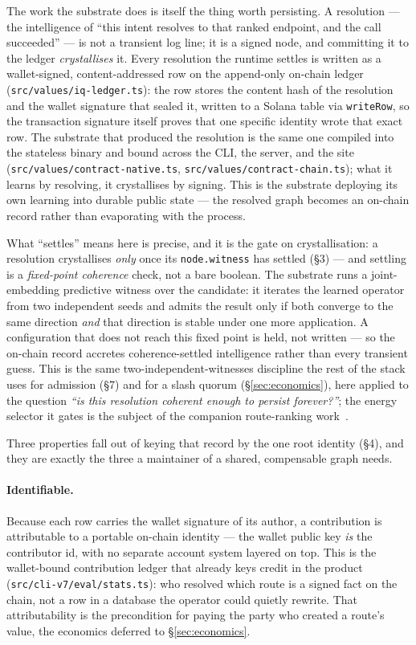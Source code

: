 \documentclass[11pt]{article}
\begin{document}
The work the substrate does is itself the thing worth persisting. A resolution ---
the intelligence of ``this intent resolves to that ranked endpoint, and the call
succeeded'' --- is not a transient log line; it is a signed node, and committing it
to the ledger \emph{crystallises} it. Every resolution the runtime settles is
written as a wallet-signed, content-addressed row on the append-only on-chain ledger
(\texttt{src/values/iq-ledger.ts}): the row stores the content hash of the resolution
and the wallet signature that sealed it, written to a Solana table via
\texttt{writeRow}, so the transaction signature itself proves that one specific
identity wrote that exact row. The substrate that produced the resolution is the same
one compiled into the stateless binary and bound across the CLI, the server, and the
site (\texttt{src/values/contract-native.ts}, \texttt{src/values/contract-chain.ts});
what it learns by resolving, it crystallises by signing. This is the substrate
deploying its own learning into durable public state --- the resolved graph becomes an
on-chain record rather than evaporating with the process.

What ``settles'' means here is precise, and it is the gate on crystallisation: a
resolution crystallises \emph{only} once its \texttt{node.witness} has settled (\S3) ---
and settling is a \emph{fixed-point coherence} check, not a bare boolean. The substrate
runs a joint-embedding predictive witness over the candidate: it iterates the learned
operator from two independent seeds and admits the result only if both converge to the
same direction \emph{and} that direction is stable under one more application. A
configuration that does not reach this fixed point is held, not written --- so the
on-chain record accretes coherence-settled intelligence rather than every transient
guess. This is the same two-independent-witnesses discipline the rest of the stack uses
for admission (\S7) and for a slash quorum (\S\ref{sec:economics}), here applied to the
question \emph{``is this resolution coherent enough to persist forever?''}; the energy
selector it gates is the subject of the companion route-ranking work~\cite{maintenance}.

Three properties fall out of keying that record by the one root identity (\S4), and
they are exactly the three a maintainer of a shared, compensable graph needs.

\paragraph{Identifiable.} Because each row carries the wallet signature of its author,
a contribution is attributable to a portable on-chain identity --- the wallet public
key \emph{is} the contributor id, with no separate account system layered on top. This
is the wallet-bound contribution ledger that already keys credit in the product
(\texttt{src/cli-v7/eval/stats.ts}): who resolved which route is a signed fact on the
chain, not a row in a database the operator could quietly rewrite. That attributability
is the precondition for paying the party who created a route's value, the economics
deferred to \S\ref{sec:economics}.
\end{document}
